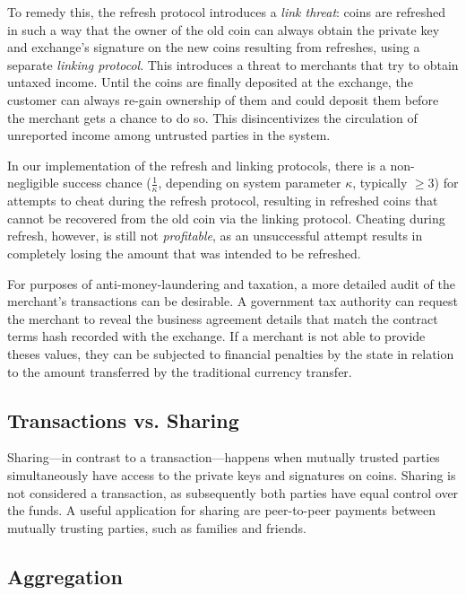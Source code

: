 To remedy this, the refresh protocol introduces a \emph{link threat}: coins are
refreshed in such a way that the owner of the old coin can always obtain the
private key and exchange's signature on the new coins resulting from refreshes,
using a separate \emph{linking protocol}.  This introduces a threat to
merchants that try to obtain untaxed income.  Until the coins are finally
deposited at the exchange, the customer can always re-gain ownership of them
and could deposit them before the merchant gets a chance to do so.  This
disincentivizes the circulation of unreported income among untrusted parties in
the system.

In our implementation of the refresh and linking protocols, there is a
non-negligible success chance ($\frac{1}{\kappa}$, depending on system parameter
$\kappa$, typically $\ge 3$) for attempts to cheat during the refresh protocol,
resulting in refreshed coins that cannot be recovered from the old coin via the
linking protocol.  Cheating during refresh, however, is still not
\emph{profitable}, as an unsuccessful attempt results in completely losing the
amount that was intended to be refreshed.


For purposes of anti-money-laundering and taxation, a more detailed audit of
the merchant's transactions can be desirable.  A government tax authority can
request the merchant to reveal the business agreement details that match the
contract terms hash recorded with the exchange.  If a merchant is not able to
provide theses values, they can be subjected to financial penalties by the
state in relation to the amount transferred by the traditional currency
transfer.

\subsection{Transactions vs. Sharing}

Sharing---in contrast to a transaction---happens when mutually trusted parties
simultaneously have access to the private keys and signatures on coins.
Sharing is not considered a transaction, as subsequently both parties have equal control
over the funds.  A useful application for sharing are peer-to-peer payments
between mutually trusting parties, such as families and friends.

\subsection{Aggregation}


